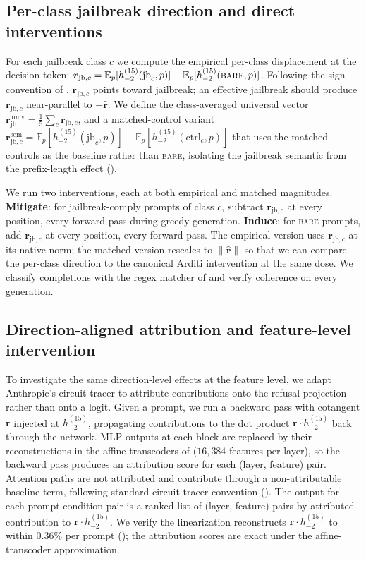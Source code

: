 \documentclass{article}
\newcommand{\rhat}{\hat{\bm{r}}}
\newcommand{\rvec}{\bm{r}}
\newcommand{\rjb}{\bm{r}_{\mathrm{jb}}}
\newcommand{\rjbc}{\bm{r}_{\mathrm{jb},c}}
\newcommand{\rjbsemc}{\bm{r}_{\mathrm{jb},c}^{\mathrm{sem}}}
\newcommand{\norm}[1]{\lVert #1 \rVert}
\begin{document}
\subsection{Per-class jailbreak direction and direct interventions}
\label{sec:methods-rjb}
For each jailbreak class $c$ we compute the empirical per-class
displacement at the decision token: $\rjbc =
\mathbb{E}_p[h_{-2}^{(15)}(\mathrm{jb}_c, p)] -
\mathbb{E}_p[h_{-2}^{(15)}(\textsc{bare}, p)]$. Following the sign
convention of \citet{ball2024jailbreaks}, $\rjbc$ points toward
jailbreak; an effective jailbreak should produce $\rjbc$
near-parallel to $-\rhat$. We define the class-averaged universal
vector $\rjb^{\,\mathrm{univ}} = \frac{1}{5}\sum_c \rjbc$, and a
matched-control variant $\rjbsemc =
\mathbb{E}_p[h_{-2}^{(15)}(\mathrm{jb}_c, p)] -
\mathbb{E}_p[h_{-2}^{(15)}(\mathrm{ctrl}_c, p)]$ that uses the
matched controls as the baseline rather than \textsc{bare}, isolating
the jailbreak semantic from the prefix-length effect
().

We run two interventions, each at both empirical and matched
magnitudes. \textbf{Mitigate}: for jailbreak-comply prompts of class
$c$, subtract $\rjbc$ at every position, every forward pass during
greedy generation. \textbf{Induce}: for \textsc{bare} prompts, add
$\rjbc$ at every position, every forward pass. The empirical version
uses $\rjbc$ at its native norm; the matched version rescales to
$\norm{\rhat}$ so that we can compare the per-class direction to the
canonical Arditi intervention at the same dose. We classify
completions with the regex matcher of \citet{arditi2024refusal} and
verify coherence on every generation.

\subsection{Direction-aligned attribution and feature-level intervention}
\label{sec:methods-attribution}

To investigate the same direction-level effects at the feature
level, we adapt Anthropic's circuit-tracer \citep{lindsey2025biology}
to attribute contributions onto the refusal projection rather than
onto a logit. Given a prompt, we run a backward pass with cotangent
$\rvec$ injected at $h_{-2}^{(15)}$, propagating contributions to
the dot product $\rvec \cdot h_{-2}^{(15)}$ back through the
network. MLP outputs at each block are replaced by their
reconstructions in the affine transcoders of
\citet{lieberum2024gemmascope} ($16{,}384$ features per layer), so
the backward pass produces an attribution score for each (layer,
feature) pair. Attention paths are not attributed and contribute
through a non-attributable baseline term, following standard
circuit-tracer convention (). The output for
each prompt-condition pair is a ranked list of (layer, feature)
pairs by attributed contribution to $\rvec \cdot h_{-2}^{(15)}$. We verify the linearization reconstructs
$\rvec \cdot h_{-2}^{(15)}$ to within $0.36\%$ per prompt
(); the attribution scores are exact
under the affine-transcoder approximation.
\end{document}
